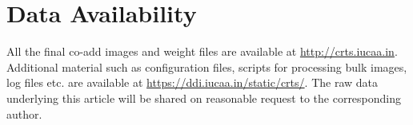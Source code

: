\documentclass[fleqn,usenatbib]{mnras}
\begin{document}
\section*{Data Availability}
All the final co-add images and weight files are available at \url{http://crts.iucaa.in}. Additional material such as configuration files, scripts for processing bulk  images, log files etc. are available at \url{https://ddi.iucaa.in/static/crts/}. The raw data underlying this article will be shared on reasonable request to the corresponding author. 



\end{document}
